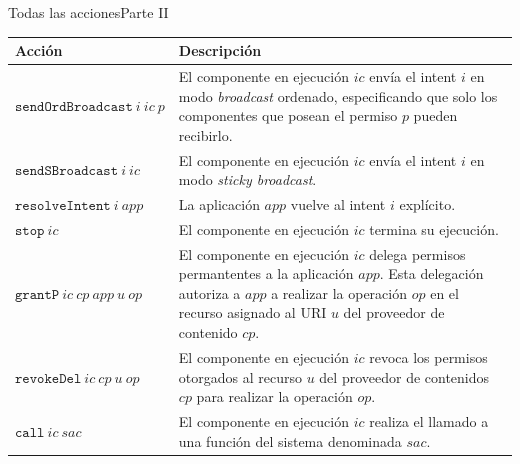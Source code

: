 \documentclass[pdf, handout]{beamer} %
\begin{document}
\begin{frame}{Todas las acciones}{Parte II}
    \fontsize{9pt}{10pt}\selectfont
    \begin{table}
        \begin{tabularx}{\linewidth}{|l X|}
            \hline
            \textbf{Acción}                    & \textbf{Descripción}                                                                                                                                                                                                 \\
            \hline
            $\mathtt{sendOrdBroadcast}~i~ic~p$ & El componente en ejecución $ic$ envía el intent $i$ en modo \textit{broadcast} ordenado,  especificando que solo los componentes que posean el permiso $p$ pueden recibirlo.                                         \\
            \hline
            $\mathtt{sendSBroadcast}~i~ic$     & El componente en ejecución $ic$ envía el intent $i$ en modo \textit{sticky broadcast}.                                                                                                                               \\
            \hline
            $\mathtt{resolveIntent}~i~app$     & La aplicación $app$ vuelve al intent $i$ explícito.                                                                                                                                                                  \\
            \hline
            $\mathtt{stop}~ic$                 & El componente en ejecución $ic$ termina su ejecución.                                                                                                                                                                \\
            \hline
            $\mathtt{grantP}~ic~cp~app~u~op$   & El componente en ejecución $ic$ delega permisos permantentes a la aplicación $app$. Esta delegación autoriza a $app$ a realizar la operación $op$ en el recurso asignado al URI $u$ del proveedor de contenido $cp$. \\
            \hline
            $\mathtt{revokeDel}~ic~cp~u~op$    & El componente en ejecución $ic$ revoca los permisos otorgados al recurso $u$ del proveedor de contenidos $cp$ para realizar la operación $op$.                                                                       \\
            \hline
            $\mathtt{call}~ic~sac$             & El componente en ejecución $ic$ realiza el llamado a una función del sistema denominada $sac$.                                                                                                                       \\
            \hline
        \end{tabularx}
    \end{table}
\end{frame}
\end{document}
